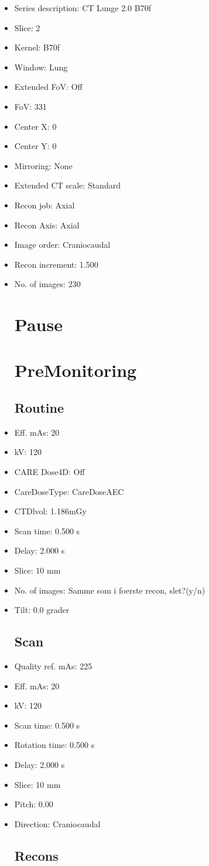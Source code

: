 \documentclass[12pt]{article}
\begin{document}
\begin{itemize}
\subsubsection{Recon 3}
\item Series description: CT Lunge 2.0 B70f
\item Slice: 2
\item Kernel: B70f
\item Window: Lung
\item Extended FoV: Off
\item FoV: 331
\item Center X: 0
\item Center Y: 0
\item Mirroring: None
\item Extended CT scale: Standard
\item Recon job: Axial
\item Recon Axis: Axial
\item Image order: Craniocaudal
\item Recon increment: 1.500
\item No. of images: 230
\section{Pause}

\section{PreMonitoring}
\subsection{Routine}
\item Eff. mAs: 20\item kV: 120\item CARE Dose4D: Off\item CareDoseType: CareDoseAEC\item CTDlvol: 1.186mGy\item Scan time: 0.500 s\item Delay: 2.000 s\item Slice: 10 mm\item No. of images: Samme som i foerste recon, slet?(y/n)\item Tilt: 0.0 grader
\subsection{Scan}
\item Quality ref. mAs: 225\item Eff. mAs: 20\item kV: 120\item Scan time: 0.500 s\item Rotation time: 0.500 s\item Delay: 2.000 s\item Slice: 10 mm\item Pitch: 0.00\item Direction: Craniocaudal\subsection{Recons}


\end{itemize}
\end{document}
